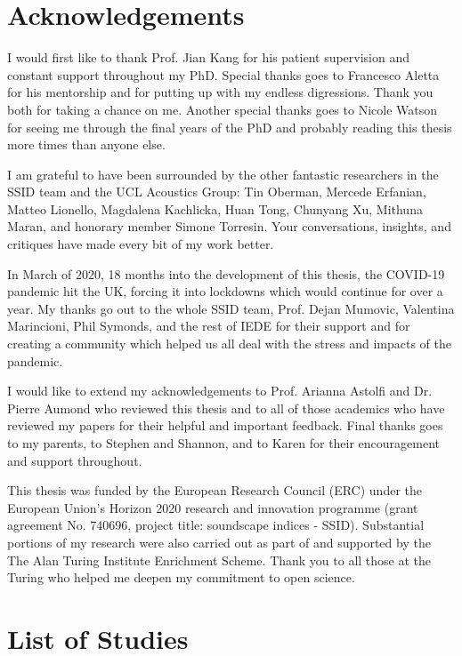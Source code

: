 \documentclass[oneside,fontsize=11pt,titlepage,chapterprefix=true
]{scrbook}
\begin{document}

\chapter*{Acknowledgements}

I would first like to thank Prof. Jian Kang for his patient supervision and constant support throughout my PhD. Special thanks goes to Francesco Aletta for his mentorship and for putting up with my endless digressions. Thank you both for taking a chance on me. Another special thanks goes to Nicole Watson for seeing me through the final years of the PhD and probably reading this thesis more times than anyone else. 

I am grateful to have been surrounded by the other fantastic researchers in the SSID team and the UCL Acoustics Group: Tin Oberman, Mercede Erfanian, Matteo Lionello, Magdalena Kachlicka, Huan Tong, Chunyang Xu, Mithuna Maran, and honorary member Simone Torresin. Your conversations, insights, and critiques have made every bit of my work better. 

In March of 2020, 18 months into the development of this thesis, the COVID-19 pandemic hit the UK, forcing it into lockdowns which would continue for over a year. My thanks go out to the whole SSID team, Prof. Dejan Mumovic, Valentina Marincioni, Phil Symonds, and the rest of IEDE for their support and for creating a community which helped us all deal with the stress and impacts of the pandemic. 

I would like to extend my acknowledgements to Prof. Arianna Astolfi and Dr. Pierre Aumond who reviewed this thesis and to all of those academics who have reviewed my papers for their helpful and important feedback. Final thanks goes to my parents, to Stephen and Shannon, and to Karen for their encouragement and support throughout.

This thesis was funded by the European Research Council (ERC) under the European Union’s Horizon 2020 research and innovation programme (grant agreement No. 740696, project title: soundscape indices - SSID). Substantial portions of my research were also carried out as part of and supported by the The Alan Turing Institute Enrichment Scheme. Thank you to all those at the Turing who helped me deepen my commitment to open science.

\chapter*{List of Studies}
\end{document}
